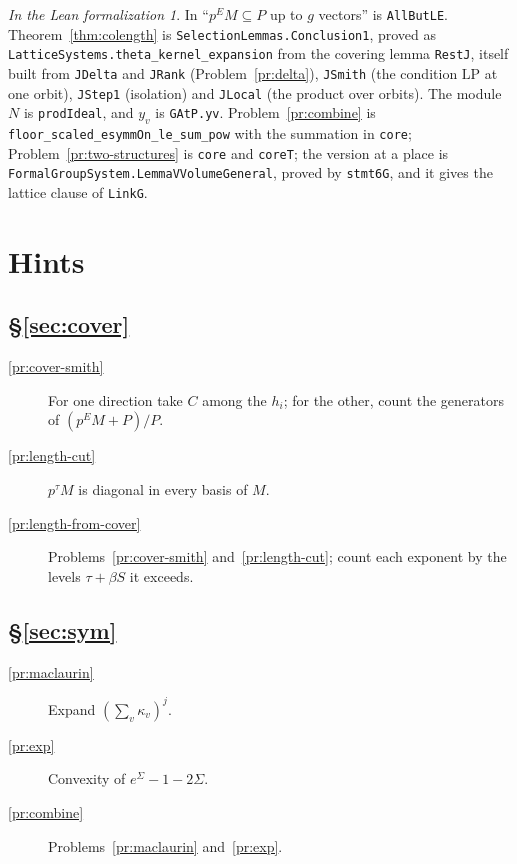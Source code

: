 \documentclass[reqno]{amsart}
\theoremstyle{definition}
\theoremstyle{plain}
\theoremstyle{remark}
\newtheorem*{leanremark}{In the Lean formalization}
\newcommand{\LP}{\mathrm{LP}}
\newcommand{\tl}[1]{\texttt{#1}}
\begin{document}
\begin{leanremark}
\raggedright In \cite{Lean} ``\(p^EM\subseteq P\) up to \(g\) vectors'' is \tl{AllButLE}.  Theorem~\ref{thm:colength} is \tl{SelectionLemmas.Conclusion1}, proved as \tl{LatticeSystems.theta\_\allowbreak{}kernel\_\allowbreak{}expansion} from the covering lemma \tl{RestJ}, itself built from \tl{JDelta} and \tl{JRank} (Problem~\ref{pr:delta}), \tl{JSmith} (the condition \(\LP\) at one orbit), \tl{JStep1} (isolation) and \tl{JLocal} (the product over orbits).  The module \(N\) is \tl{prodIdeal}, and \(y_v\) is \tl{GAtP.yv}.  Problem~\ref{pr:combine} is \tl{floor\_\allowbreak{}scaled\_\allowbreak{}esymmOn\_\allowbreak{}le\_\allowbreak{}sum\_\allowbreak{}pow} with the summation in \tl{core}; Problem~\ref{pr:two-structures} is \tl{core} and \tl{coreT}; the version at a place is \tl{FormalGroupSystem.LemmaVVolumeGeneral}, proved by \tl{stmt6G}, and it gives the lattice clause of \tl{LinkG}.
\end{leanremark}

\section*{Hints}

\subsection*{\S\ref{sec:cover}}
\begin{description}
\item[\ref{pr:cover-smith}] For one direction take \(C\) among the \(h_i\); for the other, count the generators of \((p^EM+P)/P\).
\item[\ref{pr:length-cut}] \(p^\tau M\) is diagonal in every basis of \(M\).
\item[\ref{pr:length-from-cover}] Problems~\ref{pr:cover-smith} and~\ref{pr:length-cut}; count each exponent by the levels \(\tau+\beta S\) it exceeds.
\end{description}

\subsection*{\S\ref{sec:sym}}
\begin{description}
\item[\ref{pr:maclaurin}] Expand \((\sum_v\kappa_v)^j\).
\item[\ref{pr:exp}] Convexity of \(e^\Sigma-1-2\Sigma\).
\item[\ref{pr:combine}] Problems~\ref{pr:maclaurin} and~\ref{pr:exp}.
\end{description}
\end{document}
